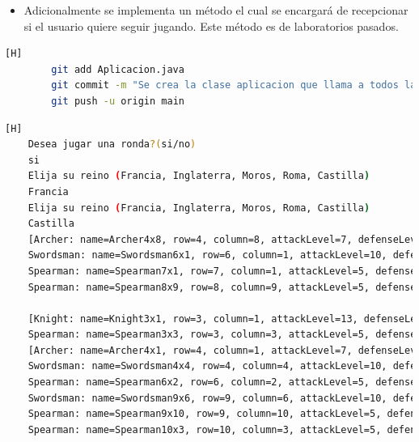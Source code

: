 \documentclass{article}
\begin{document}
	\begin{itemize}	
		\item Adicionalmente se implementa un método el cual se encargará de recepcionar si el usuario quiere seguir jugando. Este método es de laboratorios pasados.
	\end{itemize}
	
	\begin{lstlisting}[language=bash,caption={Commit: de043b03d19c52fc136cf3167d29a847991b6a47 }][H]
		git add Aplicacion.java
		git commit -m "Se crea la clase aplicacion que llama a todos las clases"			
		git push -u origin main
	\end{lstlisting}
	
	
	
	\begin{lstlisting}[language=bash,caption={Compilando y probando todo el juego }][H]
	Desea jugar una ronda?(si/no)
	si
	Elija su reino (Francia, Inglaterra, Moros, Roma, Castilla)
	Francia
	Elija su reino (Francia, Inglaterra, Moros, Roma, Castilla)
	Castilla
	[Archer: name=Archer4x8, row=4, column=8, attackLevel=7, defenseLevel=3, actualLife=3, speed=0, attitude=Repose, current=true, arrows=5]
	Swordsman: name=Swordsman6x1, row=6, column=1, attackLevel=10, defenseLevel=8, actualLife=8, speed=0, attitude=Repose, current=true, longSnow=1.0, shieldWalls=false]
	Spearman: name=Spearman7x1, row=7, column=1, attackLevel=5, defenseLevel=10, actualLife=6, speed=0, attitude=Repose, current=true, lonLance=1]
	Spearman: name=Spearman8x9, row=8, column=9, attackLevel=5, defenseLevel=10, actualLife=6, speed=0, attitude=Repose, current=true, lonLance=1]
	
	[Knight: name=Knight3x1, row=3, column=1, attackLevel=13, defenseLevel=7, actualLife=10, speed=0, attitude=Repose, current=true, currentWeapon=sword, horseRiding=false]
	Spearman: name=Spearman3x3, row=3, column=3, attackLevel=5, defenseLevel=10, actualLife=7, speed=0, attitude=Repose, current=true, lonLance=1]
	[Archer: name=Archer4x1, row=4, column=1, attackLevel=7, defenseLevel=3, actualLife=3, speed=0, attitude=Repose, current=true, arrows=5]
	Swordsman: name=Swordsman4x4, row=4, column=4, attackLevel=10, defenseLevel=8, actualLife=9, speed=0, attitude=Repose, current=true, longSnow=1.0, shieldWalls=false]
	Spearman: name=Spearman6x2, row=6, column=2, attackLevel=5, defenseLevel=10, actualLife=7, speed=0, attitude=Repose, current=true, lonLance=1]
	Swordsman: name=Swordsman9x6, row=9, column=6, attackLevel=10, defenseLevel=8, actualLife=9, speed=0, attitude=Repose, current=true, longSnow=1.0, shieldWalls=false]
	Spearman: name=Spearman9x10, row=9, column=10, attackLevel=5, defenseLevel=10, actualLife=6, speed=0, attitude=Repose, current=true, lonLance=1]
	Spearman: name=Spearman10x3, row=10, column=3, attackLevel=5, defenseLevel=10, actualLife=8, speed=0, attitude=Repose, current=true, lonLance=1]
	

\end{lstlisting}
\end{document}
